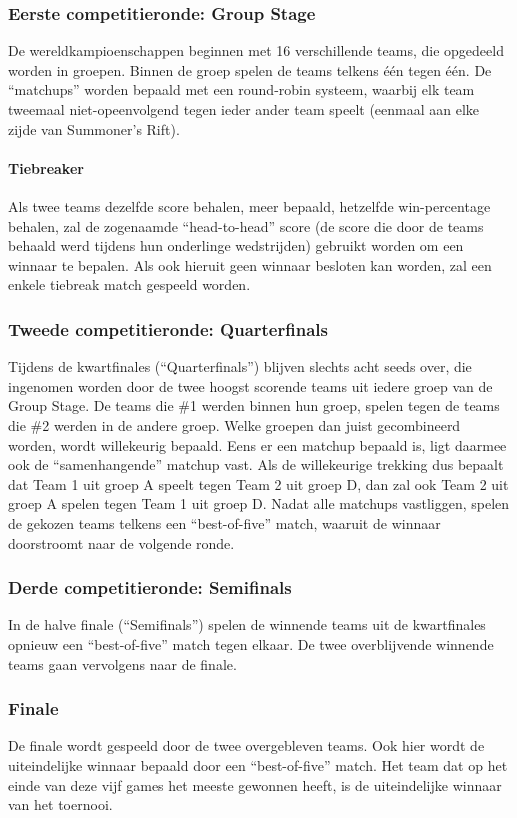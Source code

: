 \documentclass[12pt,a4paper]{article}
\begin{document}
			\subsubsection{Eerste competitieronde: Group Stage}
				De wereldkampioenschappen beginnen met 16 verschillende teams, die opgedeeld worden in groepen. Binnen de groep spelen de teams telkens één tegen één. De ``matchups'' worden bepaald met een round-robin systeem, waarbij elk team tweemaal niet-opeenvolgend tegen ieder ander team speelt (eenmaal aan elke zijde van Summoner's Rift).
				\paragraph{Tiebreaker}
				Als twee teams dezelfde score behalen, meer bepaald, hetzelfde win-percentage behalen, zal de zogenaamde ``head-to-head'' score (de score die door de teams behaald werd tijdens hun onderlinge wedstrijden) gebruikt worden om een winnaar te bepalen. Als ook hieruit geen winnaar besloten kan worden, zal een enkele tiebreak match gespeeld worden.
			\subsubsection{Tweede competitieronde: Quarterfinals}
				Tijdens de kwartfinales (``Quarterfinals'') blijven slechts acht seeds over, die ingenomen worden door de twee hoogst scorende teams uit iedere groep van de Group Stage. De teams die \#1 werden binnen hun groep, spelen tegen de teams die \#2 werden in de andere groep. Welke groepen dan juist gecombineerd worden, wordt willekeurig bepaald. Eens er een matchup bepaald is, ligt daarmee ook de ``samenhangende'' matchup vast. Als de willekeurige trekking dus bepaalt dat Team 1 uit groep A speelt tegen Team 2 uit groep D, dan zal ook Team 2 uit groep A spelen tegen Team 1 uit groep D. Nadat alle matchups vastliggen, spelen de gekozen teams telkens een ``best-of-five'' match, waaruit de winnaar doorstroomt naar de volgende ronde.
			\subsubsection{Derde competitieronde: Semifinals}
				In de halve finale (``Semifinals'') spelen de winnende teams uit de kwartfinales opnieuw een ``best-of-five'' match tegen elkaar. De twee overblijvende winnende teams gaan vervolgens naar de finale.
			\subsubsection{Finale}
				De finale wordt gespeeld door de twee overgebleven teams. Ook hier wordt de uiteindelijke winnaar bepaald door een ``best-of-five'' match. Het team dat op het einde van deze vijf games het meeste gewonnen heeft, is de uiteindelijke winnaar van het toernooi.
			\newpage
\end{document}
